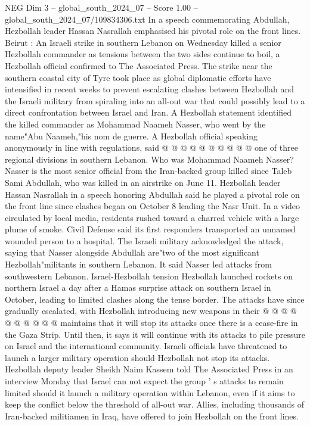 \begin{textsample}{NEG Dim 3 – global\_south\_2024\_07 – Score 1.00 – global\_south\_2024\_07/109834306.txt}
In a speech commemorating Abdullah, Hezbollah leader Hassan Nasrallah emphasised his pivotal role on the front lines.
Beirut : An Israeli strike in southern Lebanon on Wednesday killed a senior Hezbollah commander as tensions between the two sides continue to boil, a Hezbollah official confirmed to The Associated Press.
The strike near the southern coastal city of Tyre took place as global diplomatic efforts have intensified in recent weeks to prevent escalating clashes between Hezbollah and the Israeli military from spiraling into an all-out war that could possibly lead to a direct confrontation between Israel and Iran.
A Hezbollah statement identified the killed commander as Mohammad Naameh Nasser, who went by the name"Abu Naameh,"his nom de guerre.
A Hezbollah official speaking anonymously in line with regulations, said @ @ @ @ @ @ @ @ @ @ one of three regional divisions in southern Lebanon.
Who was Mohammad Naameh Nasser?
Nasser is the most senior official from the Iran-backed group killed since Taleb Sami Abdullah, who was killed in an airstrike on June 11.
Hezbollah leader Hassan Nasrallah in a speech honoring Abdullah said he played a pivotal role on the front line since clashes began on October 8 leading the Nasr Unit.
In a video circulated by local media, residents rushed toward a charred vehicle with a large plume of smoke.
Civil Defense said its first responders transported an unnamed wounded person to a hospital.
The Israeli military acknowledged the attack, saying that Nasser alongside Abdullah are"two of the most significant Hezbollah"militants in southern Lebanon.
It said Nasser led attacks from southwestern Lebanon.
Israel-Hezbollah tension Hezbollah launched rockets on northern Israel a day after a Hamas surprise attack on southern Israel in October, leading to limited clashes along the tense border.
The attacks have since gradually escalated, with Hezbollah introducing new weapons in their @ @ @ @ @ @ @ @ @ @ maintains that it will stop its attacks once there is a cease-fire in the Gaza Strip.
Until then, it says it will continue with its attacks to pile pressure on Israel and the international community.
Israeli officials have threatened to launch a larger military operation should Hezbollah not stop its attacks.
Hezbollah deputy leader Sheikh Naim Kassem told The Associated Press in an interview Monday that Israel can not expect the group ' s attacks to remain limited should it launch a military operation within Lebanon, even if it aims to keep the conflict below the threshold of all-out war.
Allies, including thousands of Iran-backed militiamen in Iraq, have offered to join Hezbollah on the front lines.

\end{textsample}
